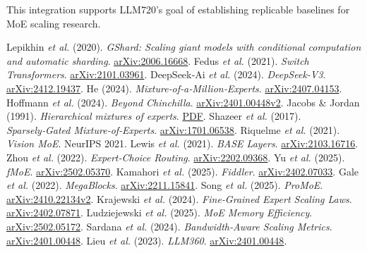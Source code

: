 \documentclass[11pt]{article}
\begin{document}
This integration supports LLM720's goal of establishing replicable baselines for MoE scaling research.

\begin{thebibliography}{99}
 Lepikhin \emph{et al.} (2020). \emph{GShard: Scaling giant models with conditional computation and automatic sharding}. \href{https://arxiv.org/abs/2006.16668}{arXiv:2006.16668}.
 Fedus \emph{et al.} (2021). \emph{Switch Transformers}. \href{https://arxiv.org/abs/2101.03961}{arXiv:2101.03961}.
 DeepSeek‑Ai \emph{et al.} (2024). \emph{DeepSeek‑V3}. \href{https://arxiv.org/pdf/2412.19437}{arXiv:2412.19437}.
 He (2024). \emph{Mixture‑of‑a‑Million‑Experts}. \href{https://arxiv.org/abs/2407.04153}{arXiv:2407.04153}.
 Hoffmann \emph{et al.} (2024). \emph{Beyond Chinchilla}. \href{https://arxiv.org/html/2401.00448v2}{arXiv:2401.00448v2}.
 Jacobs \& Jordan (1991). \emph{Hierarchical mixtures of experts}. \href{https://www.cs.toronto.edu/~fritz/absps/jjnh91.pdf}{PDF}.
 Shazeer \emph{et al.} (2017). \emph{Sparsely‑Gated Mixture‑of‑Experts}. \href{https://arxiv.org/abs/1701.06538}{arXiv:1701.06538}.
 Riquelme \emph{et al.} (2021). \emph{Vision MoE}. NeurIPS 2021.
 Lewis \emph{et al.} (2021). \emph{BASE Layers}. \href{https://arxiv.org/pdf/2103.16716}{arXiv:2103.16716}.
 Zhou \emph{et al.} (2022). \emph{Expert‑Choice Routing}. \href{https://arxiv.org/pdf/2202.09368}{arXiv:2202.09368}.
 Yu \emph{et al.} (2025). \emph{fMoE}. \href{https://arxiv.org/pdf/2502.05370}{arXiv:2502.05370}.
 Kamahori \emph{et al.} (2025). \emph{Fiddler}. \href{https://arxiv.org/pdf/2402.07033}{arXiv:2402.07033}.
 Gale \emph{et al.} (2022). \emph{MegaBlocks}. \href{https://arxiv.org/pdf/2211.15841}{arXiv:2211.15841}.
 Song \emph{et al.} (2025). \emph{ProMoE}. \href{https://arxiv.org/html/2410.22134v2}{arXiv:2410.22134v2}.
 Krajewski \emph{et al.} (2024). \emph{Fine‑Grained Expert Scaling Laws}. \href{https://arxiv.org/pdf/2402.07871}{arXiv:2402.07871}.
 Ludziejewski \emph{et al.} (2025). \emph{MoE Memory Efficiency}. \href{https://arxiv.org/pdf/2502.05172}{arXiv:2502.05172}.
 Sardana \emph{et al.} (2024). \emph{Bandwidth‑Aware Scaling Metrics}. \href{https://arxiv.org/pdf/2401.00448}{arXiv:2401.00448}.
 Lieu \emph{et al.} (2023). \emph{LLM360}. \href{https://arxiv.org/pdf/2401.00448}{arXiv:2401.00448}.
\end{thebibliography}
\end{document}
